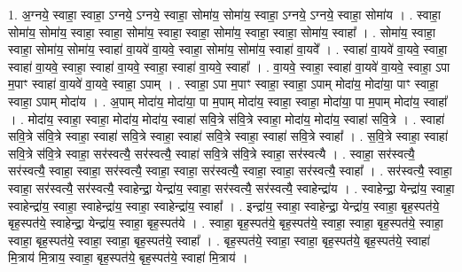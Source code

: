 \documentclass[17pt]{extarticle}
\begin{document}
1. अ॒ग्नये॒ स्वाहा॒ स्वाहा॒ ऽग्नये॒ ऽग्नये॒ स्वाहा॒ सोमा॑य॒ सोमा॑य॒ स्वाहा॒ ऽग्नये॒ ऽग्नये॒ स्वाहा॒ सोमा॑य । . स्वाहा॒ सोमा॑य॒ सोमा॑य॒ स्वाहा॒ स्वाहा॒ सोमा॑य॒ स्वाहा॒ स्वाहा॒ सोमा॑य॒ स्वाहा॒ स्वाहा॒ सोमा॑य॒ स्वाहा᳚ । . सोमा॑य॒ स्वाहा॒ स्वाहा॒ सोमा॑य॒ सोमा॑य॒ स्वाहा॑ वा॒यवे॑ वा॒यवे॒ स्वाहा॒ सोमा॑य॒ सोमा॑य॒ स्वाहा॑ वा॒यवे᳚ । . स्वाहा॑ वा॒यवे॑ वा॒यवे॒ स्वाहा॒ स्वाहा॑ वा॒यवे॒ स्वाहा॒ स्वाहा॑ वा॒यवे॒ स्वाहा॒ स्वाहा॑ वा॒यवे॒ स्वाहा᳚ । . वा॒यवे॒ स्वाहा॒ स्वाहा॑ वा॒यवे॑ वा॒यवे॒ स्वाहा॒ ऽपा म॒पाꣳ स्वाहा॑ वा॒यवे॑ वा॒यवे॒ स्वाहा॒ ऽपाम् । . स्वाहा॒ ऽपा म॒पाꣳ स्वाहा॒ स्वाहा॒ ऽपाम् मोदा॑य॒ मोदा॑या॒ पाꣳ स्वाहा॒ स्वाहा॒ ऽपाम् मोदा॑य । . अ॒पाम् मोदा॑य॒ मोदा॑या॒ पा म॒पाम् मोदा॑य॒ स्वाहा॒ स्वाहा॒ मोदा॑या॒ पा म॒पाम् मोदा॑य॒ स्वाहा᳚ । . मोदा॑य॒ स्वाहा॒ स्वाहा॒ मोदा॑य॒ मोदा॑य॒ स्वाहा॑ सवि॒त्रे स॑वि॒त्रे स्वाहा॒ मोदा॑य॒ मोदा॑य॒ स्वाहा॑ सवि॒त्रे । . स्वाहा॑ सवि॒त्रे स॑वि॒त्रे स्वाहा॒ स्वाहा॑ सवि॒त्रे स्वाहा॒ स्वाहा॑ सवि॒त्रे स्वाहा॒ स्वाहा॑ सवि॒त्रे स्वाहा᳚ । . स॒वि॒त्रे स्वाहा॒ स्वाहा॑ सवि॒त्रे स॑वि॒त्रे स्वाहा॒ सर॑स्वत्यै॒ सर॑स्वत्यै॒ स्वाहा॑ सवि॒त्रे स॑वि॒त्रे स्वाहा॒ सर॑स्वत्यै । . स्वाहा॒ सर॑स्वत्यै॒ सर॑स्वत्यै॒ स्वाहा॒ स्वाहा॒ सर॑स्वत्यै॒ स्वाहा॒ स्वाहा॒ सर॑स्वत्यै॒ स्वाहा॒ स्वाहा॒ सर॑स्वत्यै॒ स्वाहा᳚ । . सर॑स्वत्यै॒ स्वाहा॒ स्वाहा॒ सर॑स्वत्यै॒ सर॑स्वत्यै॒ स्वाहेन्द्रा॒ येन्द्रा॑य॒ स्वाहा॒ सर॑स्वत्यै॒ सर॑स्वत्यै॒ स्वाहेन्द्रा॑य । . स्वाहेन्द्रा॒ येन्द्रा॑य॒ स्वाहा॒ स्वाहेन्द्रा॑य॒ स्वाहा॒ स्वाहेन्द्रा॑य॒ स्वाहा॒ स्वाहेन्द्रा॑य॒ स्वाहा᳚ । . इन्द्रा॑य॒ स्वाहा॒ स्वाहेन्द्रा॒ येन्द्रा॑य॒ स्वाहा॒ बृह॒स्पत॑ये॒ बृह॒स्पत॑ये॒ स्वाहेन्द्रा॒ येन्द्रा॑य॒ स्वाहा॒ बृह॒स्पत॑ये । . स्वाहा॒ बृह॒स्पत॑ये॒ बृह॒स्पत॑ये॒ स्वाहा॒ स्वाहा॒ बृह॒स्पत॑ये॒ स्वाहा॒ स्वाहा॒ बृह॒स्पत॑ये॒ स्वाहा॒ स्वाहा॒ बृह॒स्पत॑ये॒ स्वाहा᳚ । . बृह॒स्पत॑ये॒ स्वाहा॒ स्वाहा॒ बृह॒स्पत॑ये॒ बृह॒स्पत॑ये॒ स्वाहा॑ मि॒त्राय॑ मि॒त्राय॒ स्वाहा॒ बृह॒स्पत॑ये॒ बृह॒स्पत॑ये॒ स्वाहा॑ मि॒त्राय॑ । \newline
\end{document}
